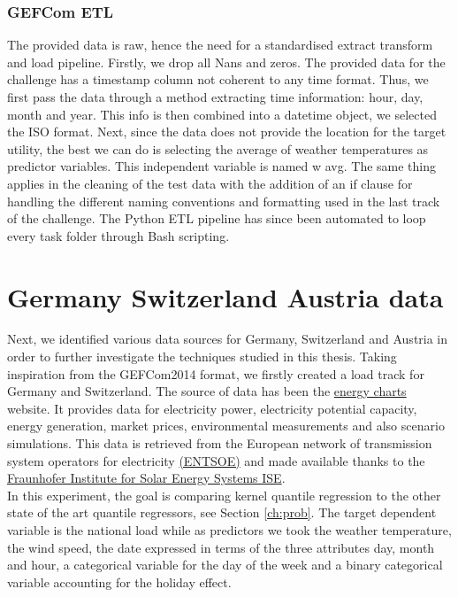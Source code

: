 \subsubsection{GEFCom ETL}
The provided data is raw, hence the need for a standardised extract transform and load pipeline. 
Firstly, we drop all Nans and zeros. The provided data for the challenge has a timestamp column not coherent to any time format. Thus, we first pass the data through a method extracting time information: hour, day, month and year. This info is then combined into a datetime object, we selected the ISO format.
Next, since the data does not provide the location for the target utility, the best we can do is selecting the average of weather temperatures as predictor variables. This independent variable is named w avg.
The same thing applies in the cleaning of the test data with the addition of an if clause for handling the different naming conventions and formatting used in the last track of the challenge. The Python ETL pipeline has since been automated to loop every task folder through Bash scripting.


\section{Germany Switzerland Austria data}
Next, we identified various data sources for Germany, Switzerland and Austria in order to further
investigate the techniques studied in this thesis.
Taking inspiration from the GEFCom2014 format, we firstly created a load track for Germany and Switzerland. 
The source of data has been the \href{https://www.energy-charts.info/index.html?l=en&c=DE}{energy charts} website. It provides data for electricity power, electricity potential capacity, energy generation, market prices, environmental measurements and also scenario simulations. This data is retrieved from the European network of transmission system operators for electricity \href{https://www.entsoe.eu/}{(ENTSOE)} and made available thanks to the \href{https://ise.fraunhofer.de/en.html}{Fraunhofer Institute for Solar Energy Systems ISE}.
\\
In this experiment, the goal is comparing kernel quantile regression to the other state of the art quantile regressors, see Section \ref{ch:prob}.
The target dependent variable is the national load while as predictors we took
the weather temperature, the wind speed, the date expressed in terms of the three attributes day, month and hour, a categorical variable for the day of the week and a binary categorical variable accounting for the holiday effect.


